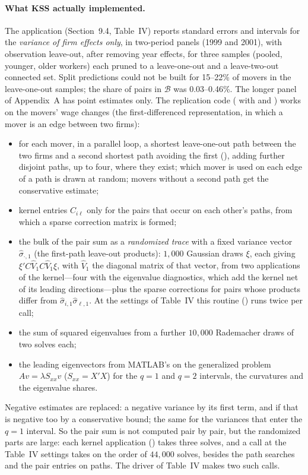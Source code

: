 \paragraph{What KSS actually implemented.} The application (Section~9.4, Table~IV) reports standard
errors and intervals for the \emph{variance of firm effects only}, in two-period panels (1999 and 2001),
with observation leave-out, after removing year effects, for three samples (pooled, younger, older
workers) each pruned to a leave-one-out and a leave-two-out connected set. Split predictions could not
be built for 15--22\% of movers in the leave-one-out samples; the share of pairs in $\mathcal B$
was 0.03--0.46\%. The longer panel of Appendix~A has point estimates only. The replication code
( with  and ) works on the movers'
wage changes (the first-differenced representation, in which a mover is an edge between two firms):
\begin{itemize}
\item for each mover, in a parallel loop, a shortest leave-one-out path between the two firms and a
second shortest path avoiding the first (), adding further
disjoint paths, up to four, where they exist; which mover is used on each edge of a path is drawn at random;
movers without a second path get the conservative estimate;
\item kernel entries $C_{i\ell}$ only for the pairs that occur on each other's paths, from which a sparse
correction matrix is formed;
\item the bulk of the pair sum as a \emph{randomized trace} with a fixed variance vector
$\hat\sigma_{\cdot,1}$ (the first-path leave-out products): $1{,}000$ Gaussian draws $\xi$, each giving
$\xi'C\hat V_1C\hat V_1\xi$, with $\hat V_1$ the diagonal matrix of that vector, from two applications of the kernel---four with the eigenvalue
diagnostics, which add the kernel net of its leading directions---plus the sparse corrections for pairs whose
products differ from $\hat\sigma_{i,1}\hat\sigma_{\ell,1}$. At the settings of Table~IV this routine
() runs twice per call;
\item the sum of squared eigenvalues from a further $10{,}000$ Rademacher draws of two solves each;
\item the leading eigenvectors from MATLAB's  on the generalized problem $Av=\lambda S_{xx}v$
($S_{xx}=X'X$) for the $q=1$ and $q=2$ intervals, the curvatures and the eigenvalue shares.
\end{itemize}
Negative estimates are replaced: a negative variance by its first term, and if that is negative too by a
conservative bound; the same for the variances that enter the $q=1$ interval. So the pair sum is not computed
pair by pair, but the randomized parts are large: each kernel application () takes three
solves, and a call at the Table~IV settings takes on the order of $44{,}000$ solves, besides the path searches
and the pair entries on paths. The driver of Table~IV makes two such calls.


